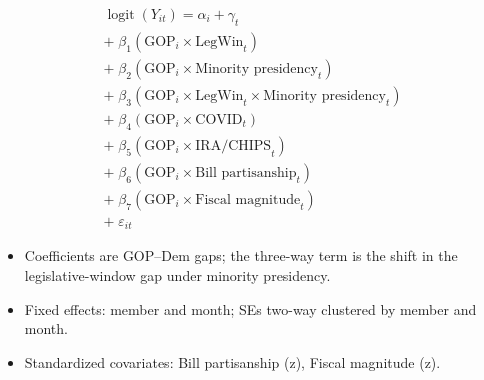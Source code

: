 \documentclass[preview,border=14pt,11pt,fleqn,leqno]{standalone}
\begin{document}
\begin{minipage}{0.92\linewidth}
\begin{equation}
\tag{2}
\begin{aligned}
\operatorname{logit}(Y_{it}) = \alpha_i + \gamma_t \\ +\; \beta_{1}(\text{GOP}_i\!\times\!\text{LegWin}_t) \\ +\; \beta_{2}(\text{GOP}_i\!\times\!\text{Minority presidency}_t) \\ +\; \beta_{3}(\text{GOP}_i\!\times\!\text{LegWin}_t\!\times\!\text{Minority presidency}_t) \\ +\; \beta_{4}(\text{GOP}_i\!\times\!\text{COVID}_t) \\ +\; \beta_{5}(\text{GOP}_i\!\times\!\text{IRA/CHIPS}_t) \\ +\; \beta_{6}(\text{GOP}_i\!\times\!\text{Bill partisanship}_t) \\ +\; \beta_{7}(\text{GOP}_i\!\times\!\text{Fiscal magnitude}_t) \\ +\; \varepsilon_{it}
\end{aligned}
\end{equation}
\vspace{0.25em}
{\itshape
\begin{itemize}[leftmargin=*,nosep]
\item Coefficients are GOP–Dem gaps; the three-way term is the shift in the legislative-window gap under minority presidency.
\item Fixed effects: member and month; SEs two-way clustered by member and month.
\item Standardized covariates: Bill partisanship (z), Fiscal magnitude (z).
\end{itemize}
}
\end{minipage}
\end{document}
